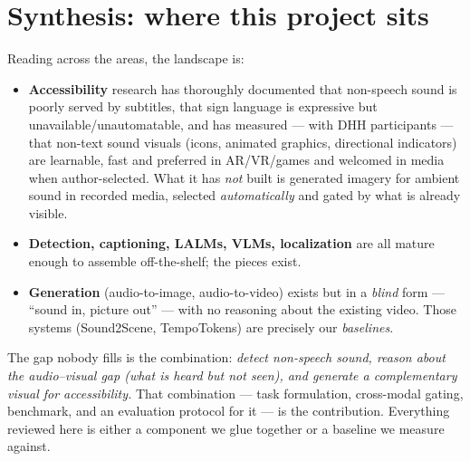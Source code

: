 \documentclass[11pt,a4paper]{article}
\begin{document}
\section{Synthesis: where this project sits}
Reading across the areas, the landscape is:
\begin{itemize}
  \item \textbf{Accessibility} research has thoroughly documented that non-speech sound is poorly
    served by subtitles, that sign language is expressive but unavailable/unautomatable, and has
    measured --- with DHH participants --- that non-text sound visuals (icons, animated graphics,
    directional indicators) are learnable, fast and preferred in AR/VR/games and welcomed in media
    when author-selected. What it has \emph{not} built is generated imagery for ambient sound in
    recorded media, selected \emph{automatically} and gated by what is already visible.
  \item \textbf{Detection, captioning, LALMs, VLMs, localization} are all mature enough to assemble
    off-the-shelf; the pieces exist.
  \item \textbf{Generation} (audio-to-image, audio-to-video) exists but in a \emph{blind} form ---
    ``sound in, picture out'' --- with no reasoning about the existing video. Those systems
    (Sound2Scene, TempoTokens) are precisely our \emph{baselines}.
\end{itemize}
The gap nobody fills is the combination: \emph{detect non-speech sound, reason about the audio--visual
gap (what is heard but not seen), and generate a complementary visual for accessibility.} That
combination --- task formulation, cross-modal gating, benchmark, and an evaluation protocol for it ---
is the contribution. Everything reviewed here is either a component we glue together or a baseline we
measure against.
\end{document}
